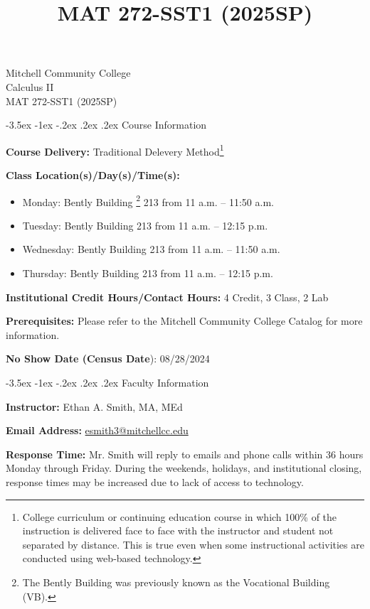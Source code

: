 \documentclass{article}
\title{MAT 272-SST1 (2025SP)}
\makeatletter
\renewcommand\section{\@startsection{section}{1}{0pt}%
  {-3.5ex \@plus -1ex \@minus -.2ex}%
  {.2ex \@plus.2ex}%
  {\normalfont\Large\bfseries}} %
\makeatother
\begin{document}
\begin{center}
    {\huge Mitchell Community College} \\[6pt]
    {\Large Calculus II} \\[6pt]
    {\Large MAT 272-SST1 (2025SP)}
\end{center}

\section{Course Information}

\textbf{Course Delivery:} Traditional Delevery Method\footnote{College curriculum or continuing education course in which 100\% of the instruction is delivered face to face with the instructor and student not  separated by distance. This is true even when some instructional activities are conducted using web‐based technology.}

\textbf{Class Location(s)/Day(s)/Time(s):}

\begin{itemize}
\item Monday: Bently Building \footnote{The Bently Building was previously known as the Vocational Building (VB).} 213 from 11 a.m. -- 11:50 a.m.
\item Tuesday: Bently Building 213 from 11 a.m. -- 12:15 p.m.
\item Wednesday: Bently Building 213 from 11 a.m. -- 11:50 a.m.
\item Thursday: Bently Building 213 from 11 a.m. -- 12:15 p.m.
\end{itemize}

\textbf{Institutional Credit Hours/Contact Hours:} 4 Credit, 3 Class, 2 Lab

\textbf{Prerequisites:} Please refer to the Mitchell Community College Catalog for more information.

\textbf{No Show Date (Census Date}): 08/28/2024

\section{Faculty Information}

\textbf{Instructor:} Ethan A. Smith, MA, MEd

\textbf{Email Address:} \href{mailto:esmith3@mitchellcc.edu}{esmith3@mitchellcc.edu}

\textbf{Response Time:} Mr. Smith will reply to emails and phone calls within 36 hours Monday through Friday. During the weekends, holidays, and institutional closing, response times may be increased due to lack of access to technology.
\end{document}
